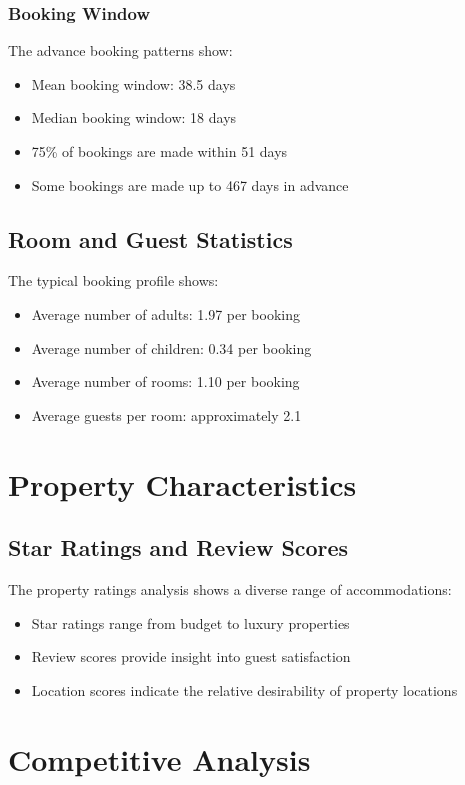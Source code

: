 \documentclass{article}
\begin{document}
\subsubsection{Booking Window}
The advance booking patterns show:
\begin{itemize}
    \item Mean booking window: 38.5 days
    \item Median booking window: 18 days
    \item 75\% of bookings are made within 51 days
    \item Some bookings are made up to 467 days in advance
\end{itemize}

\subsection{Room and Guest Statistics}
The typical booking profile shows:
\begin{itemize}
    \item Average number of adults: 1.97 per booking
    \item Average number of children: 0.34 per booking
    \item Average number of rooms: 1.10 per booking
    \item Average guests per room: approximately 2.1
\end{itemize}

\section{Property Characteristics}
\subsection{Star Ratings and Review Scores}


The property ratings analysis shows a diverse range of accommodations:
\begin{itemize}
    \item Star ratings range from budget to luxury properties
    \item Review scores provide insight into guest satisfaction
    \item Location scores indicate the relative desirability of property locations
\end{itemize}

\section{Competitive Analysis}
\end{document}
